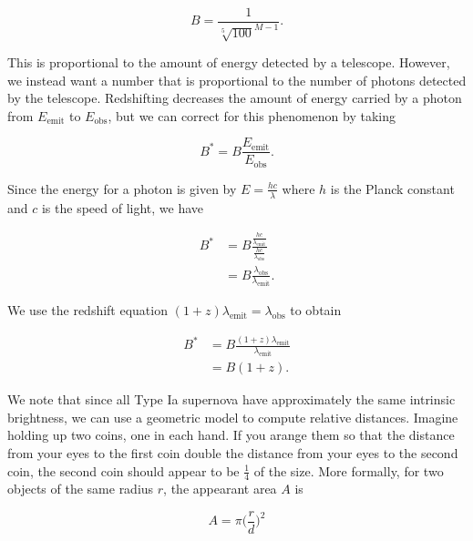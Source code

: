 \documentclass{article}
\begin{document}
\begin{equation}
  B = \frac{1}{\sqrt[5]{100}^{M - 1}}.
\end{equation}

This is proportional to the amount of energy detected by a telescope. However,
we instead want a number that is proportional to the number of photons detected
by the telescope. Redshifting decreases the amount of energy carried by a
photon from $E_{\text{emit}}$ to $E_{\text{obs}}$, but we can correct for this
phenomenon by taking

\begin{equation}
  B^{*} = B \frac{E_{\text{emit}}}{E_{\text{obs}}}.
\end{equation}

Since the energy for a photon is given by $E = \frac{hc}{\lambda}$ where $h$ is
the Planck constant and $c$ is the speed of light, we have

\begin{equation}
\begin{aligned}
  B^{*} &= B \frac{\frac{hc}{\lambda_{\text{emit}}}}{\frac{hc}{\lambda_{\text{obs}}}} \\
        &= B \frac{\lambda_{\text{obs}}}{\lambda_{\text{emit}}}.
\end{aligned}
\end{equation}

We use the redshift equation $(1 + z)\lambda_{\text{emit}} =
\lambda_{\text{obs}}$ to obtain

\begin{equation}
\begin{aligned}
  B^{*} &= B \frac{(1 + z)\lambda_{\text{emit}}}{\lambda_{\text{emit}}} \\
        &= B(1 + z).
\end{aligned}
\end{equation}

We note that since all Type Ia supernova have approximately the same intrinsic
brightness, we can use a geometric model to compute relative distances. Imagine
holding up two coins, one in each hand.  If you arange them so that the
distance from your eyes to the first coin double the distance from your eyes to
the second coin, the second coin should appear to be $\frac{1}{4}$ of the size.
More formally, for two objects of the same radius $r$, the appearant area $A$
is

\begin{equation}
  A = \pi \bigg(\frac{r}{d}\bigg)^2
\end{equation}
\end{document}
